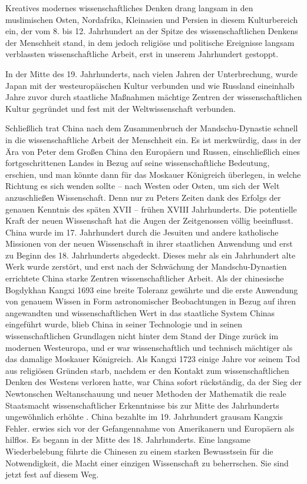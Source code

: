 \documentclass[11pt,a4paper]{book}
\begin{document}
Kreatives modernes wissenschaftliches Denken drang langsam in den muslimischen Osten, Nordafrika, Kleinasien und Persien in diesem Kulturbereich ein, der vom 8. bis 12. Jahrhundert an der Spitze des wissenschaftlichen Denkens der Menschheit stand, in dem jedoch religiöse und politische Ereignisse langsam verblassten wissenschaftliche Arbeit, erst in unserem Jahrhundert gestoppt.



In der Mitte des 19. Jahrhunderts, nach vielen Jahren der Unterbrechung, wurde Japan mit der westeuropäischen Kultur verbunden und wie Russland eineinhalb Jahre zuvor durch staatliche Maßnahmen mächtige Zentren der wissenschaftlichen Kultur gegründet und fest mit der Weltwissenschaft verbunden.



Schließlich trat China nach dem Zusammenbruch der Mandschu-Dynastie schnell in die wissenschaftliche Arbeit der Menschheit ein. Es ist merkwürdig, dass in der Ära von Peter dem Großen China den Europäern und Russen, einschließlich eines fortgeschrittenen Landes in Bezug auf seine wissenschaftliche Bedeutung, erschien, und man könnte dann für das Moskauer Königreich überlegen, in welche Richtung es sich wenden sollte -- nach Westen oder Osten, um sich der Welt anzuschließen Wissenschaft. Denn nur zu Peters Zeiten dank des Erfolgs der genauen Kenntnis des späten XVII -- frühen XVIII Jahrhunderts. Die potentielle Kraft der neuen Wissenschaft hat die Augen der Zeitgenossen völlig beeinflusst. China wurde im 17. Jahrhundert durch die Jesuiten und andere katholische Missionen von der neuen Wissenschaft in ihrer staatlichen Anwendung und erst zu Beginn des 18. Jahrhunderts abgedeckt. Dieses mehr als ein Jahrhundert alte Werk wurde zerstört, und erst nach der Schwächung der Mandschu-Dynastien errichtete China starke Zentren wissenschaftlicher Arbeit. Als der chinesische Bogdykhan Kangxi 1693 eine breite Toleranz gewährte und die erste Anwendung von genauem Wissen in Form astronomischer Beobachtungen in Bezug auf ihren angewandten und wissenschaftlichen Wert in das staatliche System Chinas eingeführt wurde, blieb China in seiner Technologie und in seinen wissenschaftlichen Grundlagen nicht hinter dem Stand der Dinge zurück im modernen Westeuropa, und er war wissenschaftlich und technisch mächtiger als das damalige Moskauer Königreich. Als Kangxi 1723 einige Jahre vor seinem Tod aus religiösen Gründen starb, nachdem er den Kontakt zum wissenschaftlichen Denken des Westens verloren hatte, war China sofort rückständig, da der Sieg der Newtonschen Weltanschauung und neuer Methoden der Mathematik die reale Staatsmacht wissenschaftlicher Erkenntnisse bis zur Mitte des Jahrhunderts ungewöhnlich erhöhte . China bezahlte im 19. Jahrhundert grausam Kangxis Fehler. erwies sich vor der Gefangennahme von Amerikanern und Europäern als hilflos. Es begann in der Mitte des 18. Jahrhunderts. Eine langsame Wiederbelebung führte die Chinesen zu einem starken Bewusstsein für die Notwendigkeit, die Macht einer einzigen Wissenschaft zu beherrschen. Sie sind jetzt fest auf diesem Weg.
\end{document}
